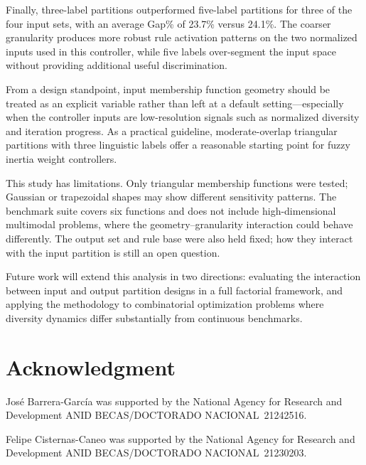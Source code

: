 \documentclass[conference]{IEEEtran}
\begin{document}
Finally, three-label partitions outperformed five-label partitions for three of the four input sets, with an average Gap\% of 23.7\% versus 24.1\%. The coarser granularity produces more robust rule activation patterns on the two normalized inputs used in this controller, while five labels over-segment the input space without providing additional useful discrimination.

From a design standpoint, input membership function geometry should be treated as an explicit variable rather than left at a default setting---especially when the controller inputs are low-resolution signals such as normalized diversity and iteration progress. As a practical guideline, moderate-overlap triangular partitions with three linguistic labels offer a reasonable starting point for fuzzy inertia weight controllers.

This study has limitations. Only triangular membership functions were tested; Gaussian or trapezoidal shapes may show different sensitivity patterns. The benchmark suite covers six functions and does not include high-dimensional multimodal problems, where the geometry--granularity interaction could behave differently. The output set and rule base were also held fixed; how they interact with the input partition is still an open question.

Future work will extend this analysis in two directions: evaluating the interaction between input and output partition designs in a full factorial framework, and applying the methodology to combinatorial optimization problems where diversity dynamics differ substantially from continuous benchmarks.


\section*{Acknowledgment}
José Barrera-García was supported by the National Agency for Research and Development ANID BECAS/DOCTORADO NACIONAL 21242516.

Felipe Cisternas-Caneo was supported by the National Agency for Research and Development ANID BECAS/DOCTORADO NACIONAL 21230203.




\end{document}
